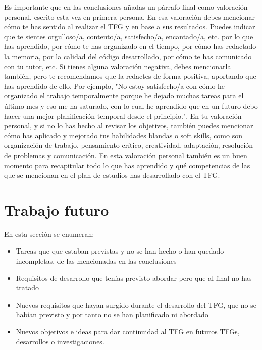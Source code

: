 Es importante que en las conclusiones añadas un párrafo final como valoración personal, escrito esta vez en primera persona. En esa valoración debes mencionar cómo te has sentido al realizar el TFG y en base a sus resultados. Puedes indicar que te sientes orgulloso/a, contento/a, satisfecho/a, encantado/a, etc. por lo que has aprendido, por cómo te has organizado en el tiempo, por cómo has redactado la memoria, por la calidad del código desarrollado, por cómo te has comunicado con tu tutor, etc. Si tienes alguna valoración negativa, debes mencionarla también, pero te recomendamos que la redactes de forma positiva, aportando que has aprendido de ello. Por ejemplo, "No estoy satisfecho/a con cómo he organizado el trabajo temporalmente porque he dejado muchas tareas para el último mes y eso me ha saturado, con lo cual he aprendido que en un futuro debo hacer una mejor planificación temporal desde el principio.". En tu valoración personal, y si no lo has hecho al revisar los objetivos, también puedes mencionar cómo has aplicado y mejorado tus habilidades blandas o soft skills, como son organización de trabajo, pensamiento crítico, creatividad, adaptación, resolución de problemas y comunicación. En esta valoración personal también es un buen momento para recapitular todo lo que has aprendido y qué competencias de las que se mencionan en el plan de estudios has desarrollado con el TFG.

 \section{Trabajo futuro}

 En esta sección se enumeran:
 \begin{itemize}
     \item Tareas que que estaban previstas y no se han hecho o han quedado incompletas, de las mencionadas en las conclusiones
     \item Requisitos de desarrollo que tenías previsto abordar pero que al final no has tratado
     \item Nuevos requisitos que hayan surgido durante el desarrollo del TFG, que no se habían previsto y por tanto no se han planificado ni abordado
     \item Nuevos objetivos e ideas para dar continuidad al TFG en futuros TFGs, desarrollos o investigaciones.
 \end{itemize} 

